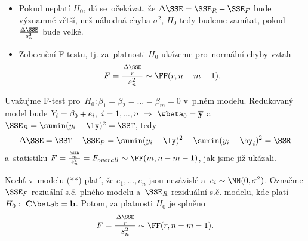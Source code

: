 \begin{itemize}
	\item Pokud neplatí $H_0$, dá se~očekávat, že $\Delta\SSE=\SSE_R-\SSE_F$ bude významně větší, než náhodná chyba $\sigma^2$, $H_0$ tedy budeme zamítat, pokud $\frac{\Delta\SSE}{s_n^2}$ bude velké.
	\item Zobecnění F-testu, tj. za~platnosti $H_0$ ukázeme pro~normální chyby vztah 
	$$ F=\frac{\frac{\Delta\SSE}{r}}{s_n^2}\sim\FF(r,n-m-1).$$
\end{itemize}
\begin{example}
	Uvažujme F-test pro~$H_0:\beta_1=\beta_2=...=\beta_m=0$ v~plném modelu. Redukovaný model bude $Y_i=\beta_0+e_i,~i=1,...,n~\Rightarrow~\wbeta_0=\overline{\textbf{y}}$ a~$\SSE_R=\sumin(y_i-\ly)^2=\SST$, tedy 
	$$ \Delta \SSE=\SST-\SSE_P=\sumin(y_i-\ly)^2-\sumin(y_i-\hy_i)^2=\SSR$$
	 a~statistiku $F=\frac{\frac{\SSR}{m}}{s_n^2}=F_{overall}\sim\FF(m,n-m-1)$, jak jsme již ukázali.
\end{example}
\begin{theorem}
	Nechť v~modelu (**) platí, že $e_1,...,e_n$ jsou nezávislé a~$e_i\sim\NN(0,\sigma^2)$. Označme $\SSE_F$ reziuální s.č. plného modelu a~$\SSE_R$ reziduální s.č. modelu, kde platí $H_0:~\textbf{C}\betab=\textbf{b}$. Potom, za platnosti $H_0$ je splněno
	$$ F=\frac{\frac{\Delta\SSE}{r}}{s_n^2}\sim\FF(r,n-m-1).$$
\end{theorem}
